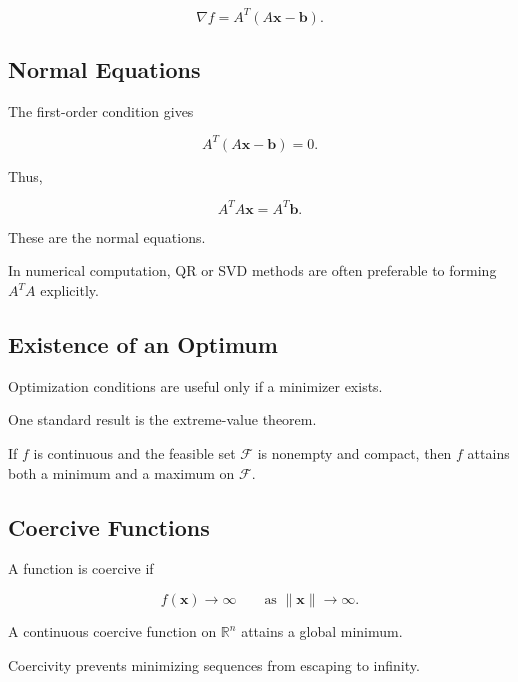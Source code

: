 \[
\boxed{
\nabla f
=
A^T
(
A\mathbf{x}-\mathbf{b}
).
}
\]

\subsection{Normal Equations}
\label{subsec:normal-equations-optimization}

The first-order condition gives

\[
A^T
(
A\mathbf{x}-\mathbf{b}
)
=
0.
\]

Thus,

\[
\boxed{
A^TA\mathbf{x}
=
A^T\mathbf{b}.
}
\]

These are the normal equations.

In numerical computation, QR or SVD methods are often preferable to
forming \(A^TA\) explicitly.

\subsection{Existence of an Optimum}
\label{subsec:existence-optimum}

Optimization conditions are useful only if a minimizer exists.

One standard result is the extreme-value theorem.

If \(f\) is continuous and the feasible set \(\mathcal{F}\) is nonempty
and compact, then \(f\) attains both a minimum and a maximum on
\(\mathcal{F}\).

\subsection{Coercive Functions}
\label{subsec:coercive-functions}

A function is coercive if

\[
\boxed{
f(\mathbf{x})
\to\infty
\qquad
\text{as }
\|\mathbf{x}\|\to\infty.
}
\]

A continuous coercive function on \(\mathbb{R}^n\) attains a global
minimum.

Coercivity prevents minimizing sequences from escaping to infinity.

